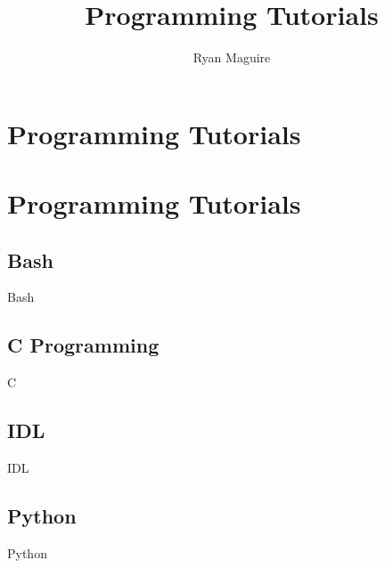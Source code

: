 \documentclass[crop=false,class=book,oneside]{standalone}
\begin{document}
    \newif\ifcoursesprogrammingtutorials
    \ifx\ifcoursesother\undefined
        \title{Programming Tutorials}
        \author{Ryan Maguire}
        \date{\vspace{-5ex}}
        \maketitle
        \tableofcontents
        \clearpage
        \chapter*{Programming Tutorials}
        \setcounter{chapter}{1}
    \else
        \chapter{Programming Tutorials}
    \fi
    \section{Bash}
        {Bash}
    \section{C Programming}
        {C}
    \section{IDL}
        {IDL}
    \section{Python}
        {Python}
\end{document}
